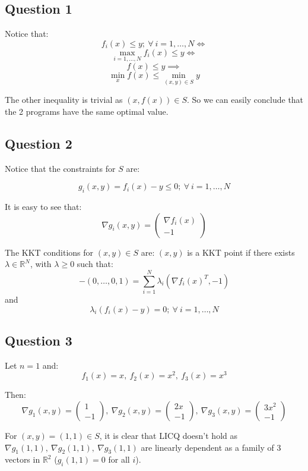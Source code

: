 \documentclass[12p]{article}
\begin{document}
\subsection*{Question 1}\hfil\par
Notice that:
\[f_i(x)\leq y;\ \forall \ i=1,\dots,N\iff\]
\[\max_{i=1,\dots,N}f_i(x)\leq y\iff \]
\[f(x)\leq y \implies \]
\[\min_xf(x)\leq\min_{(x,y)\in S}y\]

The other inequality is trivial as \((x,f(x))\in S\). So we can easily conclude that the 2 programs have the same optimal value.

\subsection*{Question 2}\hfil\par
Notice that the constraints for \(S\) are:

\[
    g_i(x,y)=f_i(x)-y\leq 0;\ \forall \ i=1,\dots,N
\]

It is easy to see that:
\[
    \nabla g_i(x,y)=\begin{pmatrix}
    \nabla f_i(x)\\
     -1
    \end{pmatrix}    
\]

The KKT conditions for \((x,y)\in S\) are: \((x,y)\) is a KKT point if there exists \(\lambda\in\mathbb{R}^N\), with \(\lambda\geq0\) such that:
\[
    -(0,\dots,0,1)=   \sum_{i=1}^{N}\lambda_i(\nabla f_i(x)^T,-1)    
\]
and
\[
    \lambda_i(f_i(x)-y)=0;\ \forall\ i=1,\dots,N  
\]
\subsection*{Question 3}\hfil\par
Let \(n=1\) and:
\[
    f_1(x)=x,\ f_2(x)=x^2,\ f_3(x)=x^3
\]

Then:
\[
  \nabla g_1(x,y)=\begin{pmatrix}
    1\\
     -1
    \end{pmatrix},\ \nabla g_2(x,y)=\begin{pmatrix}
    2x\\
     -1
    \end{pmatrix},\ \nabla g_3(x,y)=\begin{pmatrix}
    3x^2\\
     -1
    \end{pmatrix}
\]

For \((x,y)=(1,1)\in S\), it is clear that LICQ doesn't hold as \(\nabla g_1(1,1),\ \nabla g_2(1,1),\ \nabla g_3(1,1)\) are linearly dependent as a family of 3 vectors in \(\mathbb{R}^2\) (\(g_i(1,1)=0\) for all \(i\)).
\end{document}
